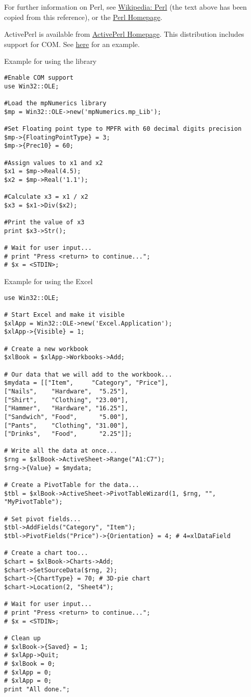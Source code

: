 \vpara
For further information on Perl, see \href{http://en.wikipedia.org/wiki/Perl}{Wikipedia: Perl} (the text above has been copied from this reference), or the  \href{http://www.perl.org/}{Perl Homepage}.

\vpara
ActivePerl is available from  \href{http://www.activestate.com/activeperl/downloads}{ActivePerl Homepage}. This distribution includes support for COM. See \href{http://support.microsoft.com/kb/214797/en-us}{here} for an example.


\vpara
Example for using the library

\begin{lstlisting}
#Enable COM support
use Win32::OLE;

#Load the mpNumerics library
$mp = Win32::OLE->new('mpNumerics.mp_Lib');

#Set Floating point type to MPFR with 60 decimal digits precision
$mp->{FloatingPointType} = 3;
$mp->{Prec10} = 60;

#Assign values to x1 and x2
$x1 = $mp->Real(4.5);
$x2 = $mp->Real('1.1');

#Calculate x3 = x1 / x2
$x3 = $x1->Div($x2);

#Print the value of x3
print $x3->Str();

# Wait for user input...
# print "Press <return> to continue...";
# $x = <STDIN>;
\end{lstlisting}


\vpara
Example for using the Excel

\begin{lstlisting}
use Win32::OLE;

# Start Excel and make it visible
$xlApp = Win32::OLE->new('Excel.Application');
$xlApp->{Visible} = 1;

# Create a new workbook
$xlBook = $xlApp->Workbooks->Add;

# Our data that we will add to the workbook...
$mydata = [["Item",     "Category", "Price"], 
["Nails",    "Hardware",  "5.25"],
["Shirt",    "Clothing", "23.00"],
["Hammer",   "Hardware", "16.25"],
["Sandwich", "Food",      "5.00"],
["Pants",    "Clothing", "31.00"],
["Drinks",   "Food",      "2.25"]];

# Write all the data at once...
$rng = $xlBook->ActiveSheet->Range("A1:C7");
$rng->{Value} = $mydata;

# Create a PivotTable for the data...
$tbl = $xlBook->ActiveSheet->PivotTableWizard(1, $rng, "", "MyPivotTable");

# Set pivot fields...
$tbl->AddFields("Category", "Item");
$tbl->PivotFields("Price")->{Orientation} = 4; # 4=xlDataField

# Create a chart too...
$chart = $xlBook->Charts->Add;
$chart->SetSourceData($rng, 2);
$chart->{ChartType} = 70; # 3D-pie chart
$chart->Location(2, "Sheet4");

# Wait for user input...
# print "Press <return> to continue...";
# $x = <STDIN>;

# Clean up
# $xlBook->{Saved} = 1;
# $xlApp->Quit;
# $xlBook = 0;
# $xlApp = 0;
# $xlApp = 0;
print "All done.";
\end{lstlisting}





